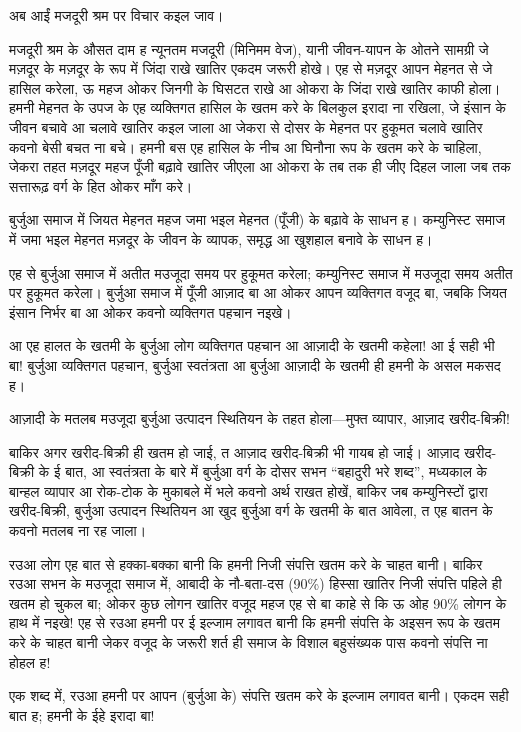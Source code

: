 \documentclass[12pt,a4paper,oneside]{book}
\begin{document}
अब आईं मजदूरी श्रम पर विचार कइल जाव।

मजदूरी श्रम के औसत दाम ह न्यूनतम मजदूरी (मिनिमम वेज), यानी जीवन-यापन के ओतने सामग्री जे मज़दूर के मज़दूर के रूप में जिंदा राखे खातिर एकदम जरूरी होखे। एह से मज़दूर आपन मेहनत से जे हासिल करेला, ऊ महज ओकर जिनगी के घिसटत राखे आ ओकरा के जिंदा राखे खातिर काफी होला। हमनी मेहनत के उपज के एह व्यक्तिगत हासिल के खतम करे के बिलकुल इरादा ना रखिला, जे इंसान के जीवन बचावे आ चलावे खातिर कइल जाला आ जेकरा से दोसर के मेहनत पर हुकूमत चलावे खातिर कवनो बेसी बचत ना बचे। हमनी बस एह हासिल के नीच आ घिनौना रूप के खतम करे के चाहिला, जेकरा तहत मज़दूर महज पूँजी बढ़ावे खातिर जीएला आ ओकरा के तब तक ही जीए दिहल जाला जब तक सत्तारूढ़ वर्ग के हित ओकर माँग करे।

बुर्जुआ समाज में जियत मेहनत महज जमा भइल मेहनत (पूँजी) के बढ़ावे के साधन ह। कम्युनिस्ट समाज में जमा भइल मेहनत मज़दूर के जीवन के व्यापक, समृद्ध आ खुशहाल बनावे के साधन ह।

एह से बुर्जुआ समाज में अतीत मउजूदा समय पर हुकूमत करेला; कम्युनिस्ट समाज में मउजूदा समय अतीत पर हुकूमत करेला। बुर्जुआ समाज में पूँजी आज़ाद बा आ ओकर आपन व्यक्तिगत वजूद बा, जबकि जियत इंसान निर्भर बा आ ओकर कवनो व्यक्तिगत पहचान नइखे।

आ एह हालत के खतमी के बुर्जुआ लोग व्यक्तिगत पहचान आ आज़ादी के खतमी कहेला! आ ई सही भी बा! बुर्जुआ व्यक्तिगत पहचान, बुर्जुआ स्वतंत्रता आ बुर्जुआ आज़ादी के खतमी ही हमनी के असल मकसद ह।

आज़ादी के मतलब मउजूदा बुर्जुआ उत्पादन स्थितियन के तहत होला—मुफ्त व्यापार, आज़ाद खरीद-बिक्री!

बाकिर अगर खरीद-बिक्री ही खतम हो जाई, त आज़ाद खरीद-बिक्री भी गायब हो जाई। आज़ाद खरीद-बिक्री के ई बात, आ स्वतंत्रता के बारे में बुर्जुआ वर्ग के दोसर सभन “बहादुरी भरे शब्द”, मध्यकाल के बान्हल व्यापार आ रोक-टोक के मुकाबले में भले कवनो अर्थ राखत होखें, बाकिर जब कम्युनिस्टों द्वारा खरीद-बिक्री, बुर्जुआ उत्पादन स्थितियन आ खुद बुर्जुआ वर्ग के खतमी के बात आवेला, त एह बातन के कवनो मतलब ना रह जाला।

रउआ लोग एह बात से हक्का-बक्का बानी कि हमनी निजी संपत्ति खतम करे के चाहत बानी। बाकिर रउआ सभन के मउजूदा समाज में, आबादी के नौ-बता-दस (90\%) हिस्सा खातिर निजी संपत्ति पहिले ही खतम हो चुकल बा; ओकर कुछ लोगन खातिर वजूद महज एह से बा काहे से कि ऊ ओह 90\% लोगन के हाथ में नइखे! एह से रउआ हमनी पर ई इल्जाम लगावत बानी कि हमनी संपत्ति के अइसन रूप के खतम करे के चाहत बानी जेकर वजूद के जरूरी शर्त ही समाज के विशाल बहुसंख्यक पास कवनो संपत्ति ना होहल ह!

एक शब्द में, रउआ हमनी पर आपन (बुर्जुआ के) संपत्ति खतम करे के इल्जाम लगावत बानी। एकदम सही बात ह; हमनी के ईहे इरादा बा!
\end{document}
